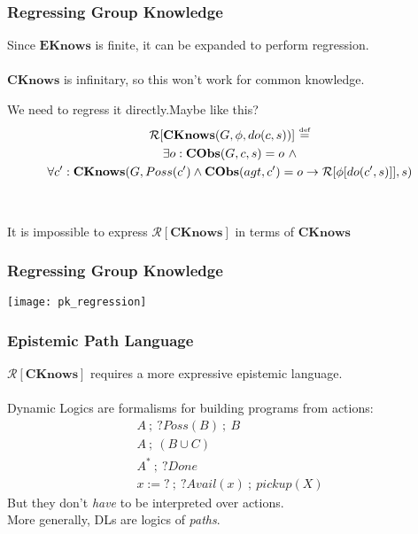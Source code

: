 \documentclass{beamer}
\newcommand{\isdef}{\hbox{$\stackrel{\mbox{\tiny def}}{=}$}}
\newcommand{\Reg}{\mathcal{R}}
\newcommand{\CKnows}{\mathbf{CKnows}}
\begin{document}
\begin{frame}
\frametitle{Regressing Group Knowledge}
Since $\mathbf{EKnows}$ is finite, it can be expanded to perform regression.
\ \\
\ \\
$\mathbf{CKnows}$ is infinitary, so this won't work for common knowledge.

We need to regress it directly.\pause Maybe like this?
\begin{multline*}
\mathcal{R}[\mathbf{CKnows}(G,\phi,do(c,s))]\ \isdef \\
\exists o: \mathbf{CObs}(G,c,s)=o\ \wedge\\
\forall c': \mathbf{CKnows}(G,Poss(c') \wedge \mathbf{CObs}(agt,c')=o \rightarrow \mathcal{R}[\phi[do(c',s)]],s)
\end{multline*}
\ \\
\ \\
\pause
It is \alert{impossible} to express $\mathcal{R}[\mathbf{CKnows}]$ in terms of $\mathbf{CKnows}$
\end{frame}

\begin{frame}
\frametitle{Regressing Group Knowledge}
\begin{center}
  \texttt{[image: pk\_regression]}
\end{center}
\end{frame}

\begin{frame}
\frametitle{Epistemic Path Language}
$\Reg[\CKnows]$ requires a more expressive epistemic language.
\ \\
\ \\
Dynamic Logics are formalisms for building programs from actions:
\begin{gather*}
A\ ;\ ?Poss(B)\ ;\ B \\
A\ ;\ (B \cup C) \\
A^*\ ;\ ?Done \\
x:=?\ ;\ ?Avail(x)\ ;\ pickup(X)
\end{gather*}
But they don't \emph{have} to be interpreted over actions.\\
More generally, DLs are logics of \emph{paths}.
\end{frame}
\end{document}
